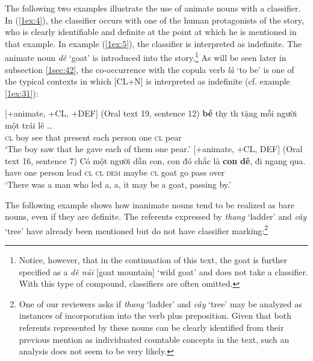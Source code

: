 \documentclass[output=paper]{langsci/langscibook}
\begin{document}
The following two examples illustrate the use of animate nouns with a classifier. In (\ref{1ex:4}), the classifier occurs with one of the human protagonists of the story, who is clearly identifiable and definite at the point at which he is mentioned in that example. In example (\ref{1ex:5}), the classifier is interpreted as indefinite. The animate noun {\emph{d\^e}} `goat' is introduced into the story.\footnote{Notice, however, that in the continuation of this text, the goat is further specified as a {\emph{d\^e n\'ui}} [goat mountain] `wild goat' and does not take a classifier. With this type of compound, classifiers are often omitted.} As will be seen later in subsection \ref{1sec:42}, the co-occurrence with the copula verb {\emph{l\`a}} `to be' is one of the typical contexts in which [CL+N] is interpreted as indefinite (cf. example \ref{1ex:31}):

\begin{exe}
\ex\label{1ex:4}
[+animate, +CL, +DEF] (Oral text 19, sentence 12)
\exi{}
 {\textbf{bé}}   th{\daa}y  th{\dae}  tặng        mỗi   người    một  trái  lê … \\
{\textsc{cl}}  boy  see   that  present  each  person   one  {\textsc{cl}}   pear \\
\glt `The boy saw that he gave each of them one pear.'
\ex\label{1ex:5}
[+animate, +CL, \minus DEF] (Oral text 16, sentence 7) 
\exi{}
\gll Có 	một 	người   dẫn  con,  con  đó      {chắc là}   {\textbf{con}}  {\textbf{dê}},    đi    ngang   qua. \\
have  one   person  lead  {\textsc{cl}}   {\textsc{cl}}  {\textsc{dem}}  maybe    {\textsc{cl}}  goat   go   pass      over \\
\glt `There was a man who led a, a, it may be a goat, passing by.' \\
\end{exe}

\newpage
The following example shows how inanimate nouns tend to be realized as bare nouns, even if they are definite. The referents expressed by {\emph{thang}} `ladder' and {\emph{cây}} `tree' have already been mentioned but do not have classifier marking:\footnote{One of our reviewers asks if {\emph{thang}} `ladder' and {\emph{cây}} `tree' may be analyzed as instances of incorporation into the verb plus preposition. Given that both referents represented by these nouns can be clearly identified from their previous mention as individuated countable concepts in the text, such an analysis does not seem to be very likely.}
\end{document}
